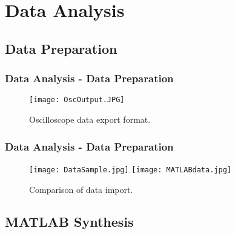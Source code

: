 %
%

\section{Data Analysis}
\subsection{Data Preparation}
\begin{frame}

	\frametitle{Data Analysis - Data Preparation}
	
	\begin{figure}[h!]
		\centering
		\texttt{[image: OscOutput.JPG]}
		\caption{Oscilloscope data export format.}
	\end{figure}

\end{frame}


\begin{frame}

	\frametitle{Data Analysis - Data Preparation}
	
	\begin{figure}[h!]
		\texttt{[image: DataSample.jpg]}%
		\texttt{[image: MATLABdata.jpg]}
		
		\caption{Comparison of data import.}
	\end{figure}
	
\end{frame}


\subsection{MATLAB Synthesis}


